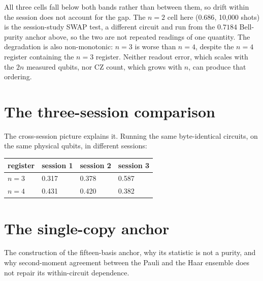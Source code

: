 All three cells fall below both bands rather than between them, so drift
within the session does not account for the gap. The \(n = 2\) cell here
(\(0.686\), 10{,}000 shots) is the session-study SWAP test, a different
circuit and run from the \(0.7184\) Bell-purity anchor above, so the two
are not repeated readings of one quantity. The degradation is also
non-monotonic: \(n = 3\) is worse than \(n = 4\), despite the \(n = 4\)
register containing the \(n = 3\) register. Neither readout error, which
scales with the \(2n\) measured qubits, nor CZ count, which grows with
\(n\), can produce that ordering.

\section{The three-session comparison}\label{supp:sessions}

The cross-session picture explains it. Running the same byte-identical
circuits, on the same physical qubits, in different sessions:

\begin{table}[htbp]
\centering
\setlength{\tabcolsep}{10pt}
\begin{tabular}{@{}llll@{}}
\toprule
register & session 1 & session 2 & session 3 \\
\midrule
\(n = 3\) & 0.317 & 0.378 & 0.587 \\
\(n = 4\) & 0.431 & 0.420 & 0.382 \\
\bottomrule
\end{tabular}
\end{table}

\section{The single-copy anchor}\label{supp:anchor}

The construction of the fifteen-basis anchor, why its statistic is not a
purity, and why second-moment agreement between the Pauli and the Haar
ensemble does not repair its within-circuit dependence.

